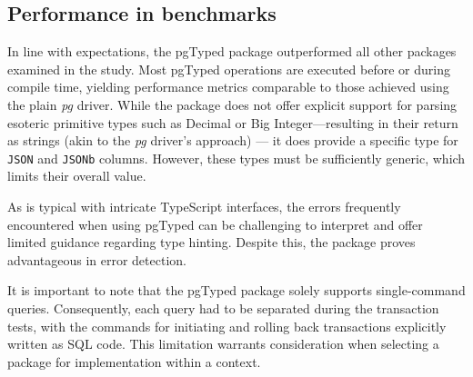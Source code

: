 \subsection{Performance in benchmarks}
In line with expectations, the pgTyped package outperformed all other packages
examined in the study. Most pgTyped operations are executed before or during
compile time, yielding performance metrics comparable to those achieved using
the plain \textit{pg} driver. While the package does not offer explicit support for
parsing esoteric primitive types such as Decimal or Big Integer—resulting in
their return as strings (akin to the \textit{pg} driver's approach) — it does provide a
specific type for \texttt{JSON} and \texttt{JSONb} columns. However, these types
must be sufficiently generic, which limits their overall value.

As is typical with intricate TypeScript interfaces, the errors frequently
encountered when using pgTyped can be challenging to interpret and offer
limited guidance regarding type hinting. Despite this, the package proves
advantageous in error detection.

It is important to note that the pgTyped package solely supports
single-command queries. Consequently, each query had to be separated during the
transaction tests, with the commands for initiating and rolling back
transactions explicitly written as SQL code. This limitation warrants
consideration when selecting a package for implementation within a context.
